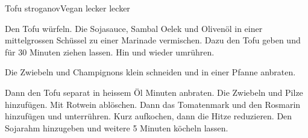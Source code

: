 
\begin{recipe}[]{Tofu stroganov}{Vegan lecker lecker}{}



\step
Den Tofu w\"urfeln. Die Sojasauce, Sambal Oelek und Oliven\"ol in einer mittelgrossen Sch\"ussel zu einer Marinade vermischen. Dazu den Tofu geben und f\"ur 30 Minuten ziehen lassen. Hin und wieder umr\"uhren.

\step
Die Zwiebeln und Champignons klein schneiden und in einer Pfanne anbraten.

\step
Dann den Tofu separat in heissem \"Ol  Minuten anbraten. Die Zwiebeln und Pilze hinzuf\"ugen. Mit Rotwein abl\"oschen. Dann das Tomatenmark und den Rosmarin hinzuf\"ugen und unterr\"uhren. Kurz aufkochen, dann die Hitze reduzieren. Den Sojarahm hinzugeben und weitere 5 Minuten k\"ocheln lassen.


\end{recipe}

